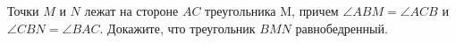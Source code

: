 \begin{ex}
	\begin{condition}
		Точки \( M  \) и \( N  \) лежат на стороне \( AC  \) треугольника M, причем \(\angle ABM = \angle ACB  \) и \( \angle CBN = \angle BAC \). Докажите, что треугольник \( BMN  \) равнобедренный.
	\end{condition}
\end{ex}